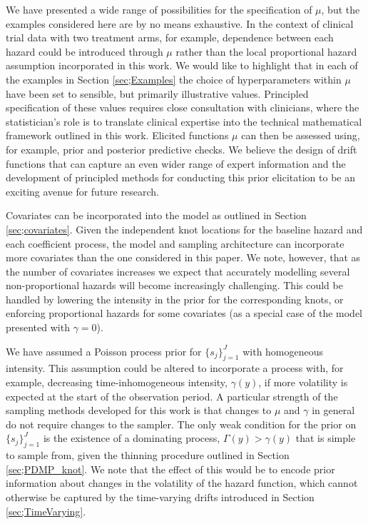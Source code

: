 \documentclass[ba,preprint]{imsart}
\theoremstyle{plain}
\theoremstyle{definition}
\theoremstyle{remark}
\begin{document}
We have presented a wide range of possibilities for the specification of $\mu$, but the examples considered here are by no means exhaustive. In the context of clinical trial data with two treatment arms, for example, dependence between each hazard could be introduced through $\mu$ rather than the local proportional hazard assumption incorporated in this work. {\color{red} We would like to highlight that in each of the examples in Section \ref{sec;Examples} the choice of hyperparameters within $\mu$ have been set to sensible, but primarily illustrative values. Principled specification of these values requires close consultation with clinicians, where the statistician's role is to translate clinical expertise into the technical mathematical framework outlined in this work. Elicited functions $\mu$ can then be assessed using, for example, prior and posterior predictive checks.}  We believe the design of drift functions that can capture an even wider range of expert information {\color{red} and the development of principled methods for conducting this prior elicitation} to be an exciting avenue for future research. 

{\color{red} Covariates can be incorporated into the model as outlined in Section \ref{sec;covariates}. Given the independent knot locations for the baseline hazard and each coefficient process, the model and sampling architecture can incorporate more covariates than the one considered in this paper. We note, however, that as the number of covariates increases we expect that accurately modelling several non-proportional hazards will become increasingly challenging. This could be handled by lowering the intensity in the prior for the corresponding knots, or enforcing proportional hazards for some covariates (as a special case of the model presented with $\gamma = 0$).}

We have assumed a Poisson process prior for $\{s_j\}_{j=1}^J$ with homogeneous intensity. This assumption could be altered to incorporate a process with, for example, {\color{red}decreasing time-inhomogeneous intensity, $\gamma(y)$,} if more volatility is expected at the start of the observation period. A particular strength of the sampling methods developed for this work is that changes to $\mu$ and $\gamma$ in general do not require changes to the sampler. The only weak condition for the prior on $\{s_j\}_{j=1}^J$ is the existence of a dominating process, {\color{red}$\Gamma(y) > \gamma(y)$} that is simple to sample from, given the thinning procedure outlined in Section \ref{sec;PDMP_knot}. {\color{red}We note that the effect of this would be to encode prior information about changes in the volatility of the hazard function, which cannot otherwise be captured by the time-varying drifts introduced in Section \ref{sec;TimeVarying}.}
\end{document}
